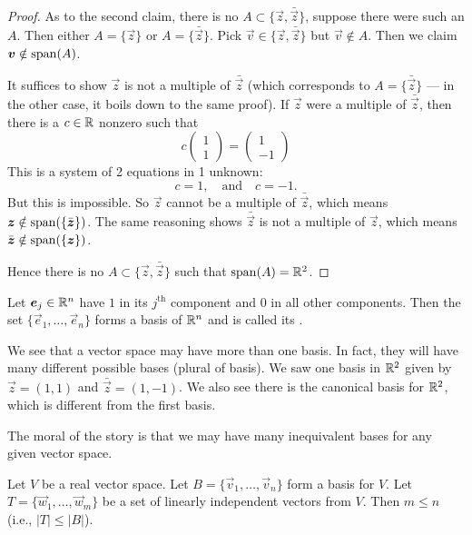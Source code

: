 \begin{proof}
  As to the second claim, there is no $A\subset\{\vec{z},\bar{\vec{z}}\}$,
  suppose there were such an $A$. Then either $A=\{\vec{z}\}$ or
  $A=\{\bar{\vec{z}}\}$. Pick $\vec{v}\in\{\vec{z},\bar{\vec{z}}\}$ but
  $\vec{v}\notin A$. Then we claim $\boldsymbol{v}\notin\operatorname{span}(A)$.

  It suffices to show $\vec{z}$ is not a multiple of $\bar{\vec{z}}$
  (which corresponds to $A=\{\bar{\vec{z}}\}$ --- in the other case, it
  boils down to the same proof). If $\vec{z}$ were a multiple of
  $\bar{\vec{z}}$, then there is a $c\in\mathbb{R}$ nonzero such that
  \begin{equation}
c\begin{pmatrix}1\\1
\end{pmatrix} = \begin{pmatrix}1\\-1
\end{pmatrix}
  \end{equation}
  This is a system of 2 equations in 1 unknown:
  \begin{equation}
c=1,\quad\mbox{and}\quad c=-1.
  \end{equation}
  But this is impossible. So $\vec{z}$ cannot be a multiple of
  $\bar{\vec{z}}$, which means $\boldsymbol{z}\notin\operatorname{span}(\{\bar{\boldsymbol{z}}\})$.
  The same reasoning shows $\bar{\vec{z}}$ is not a multiple of
  $\vec{z}$, which means $\bar{\boldsymbol{z}}\notin\operatorname{span}(\{\boldsymbol{z}\})$.

  Hence there is no $A\subset\{\vec{z},\bar{\vec{z}}\}$ such that $\operatorname{span}(A)=\mathbb{R}^{2}$.
\end{proof}

\begin{example}
Let $\boldsymbol{e}_{j}\in\mathbb{R}^{n}$ have $1$ in its $j^{\text{th}}$ component
and $0$ in all other components. Then the set
$\{\vec{e}_{1},\dots,\vec{e}_{n}\}$ forms a basis of $\mathbb{R}^{n}$ and is
called its .
\end{example}

We see that a vector space may have more than one basis. In fact, they
will have many different possible bases (plural of basis). We saw one
basis in $\mathbb{R}^{2}$ given by $\vec{z}=(1,1)$ and
$\bar{\vec{z}}=(1,-1)$. We also see there is the canonical basis for
$\mathbb{R}^{2}$, which is different from the first basis.

The moral of the story is that we may have many inequivalent bases for
any given vector space.

\begin{lemma}
Let $V$ be a real vector space.
Let $B=\{\vec{v}_{1},\dots,\vec{v}_{n}\}$ form a basis for $V$.
Let $T=\{\vec{w}_{1},\dots,\vec{w}_{m}\}$ be a set of linearly
independent vectors from $V$.
Then $m\leq n$ (i.e., $|T|\leq|B|$).
\end{lemma}

